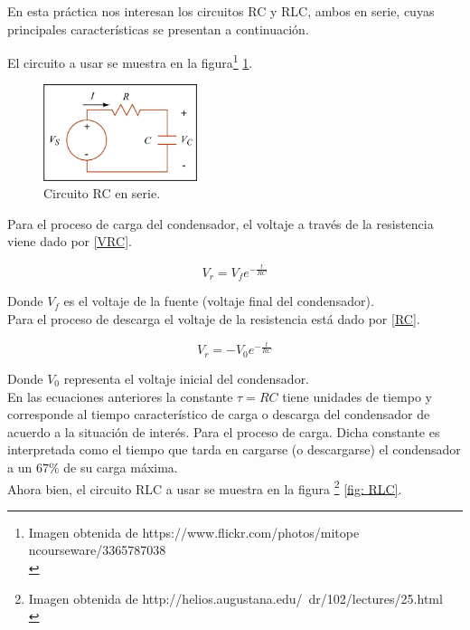 \documentclass[prb,aps,twocolumn,preprintnumbers,amsmath,amssymb]{revtex4}
\begin{document}
En esta práctica nos interesan los circuitos RC y RLC, ambos en serie, cuyas principales características se presentan a continuación.


El circuito a usar se muestra en la figura\footnote{Imagen obtenida de https://www.flickr.com/photos/mitope\\ncourseware/3365787038\\} \ref{fig: RC}.

\begin{figure}[h!]
	\centering
	\includegraphics[width=0.4\textwidth]{RC}
	\caption{ Circuito RC en serie. }
	\label{fig: RC}
\end{figure} 

Para el proceso de carga del condensador, el voltaje a través de la resistencia viene dado por \eqref{VRC}.

\begin{equation}
\label{VRC}
V_{r} = V_{f}e^{-\frac{t}{RC}}
\end{equation}

Donde $V_{f}$ es el voltaje de la fuente (voltaje final del condensador).\\

Para el proceso de descarga el voltaje de la resistencia está dado por \eqref{RC}.

\begin{equation}
\label{RC}
V_{r} = -V_{0}e^{-\frac{t}{RC}}
\end{equation}

Donde $V_{0}$ representa el voltaje inicial del condensador.\\

En las ecuaciones anteriores la constante $\tau = RC$ tiene unidades de tiempo y corresponde al tiempo característico de carga o descarga del condensador de acuerdo a la situación de interés. Para el proceso de carga. Dicha constante es interpretada como el tiempo que tarda en cargarse (o descargarse) el condensador a un $67\%$ de su carga máxima.\\

Ahora bien, el circuito RLC a usar se muestra en la figura \footnote{Imagen obtenida de http://helios.augustana.edu/~dr/102/lectures/25.html\\} \ref{fig: RLC}.
\end{document}
